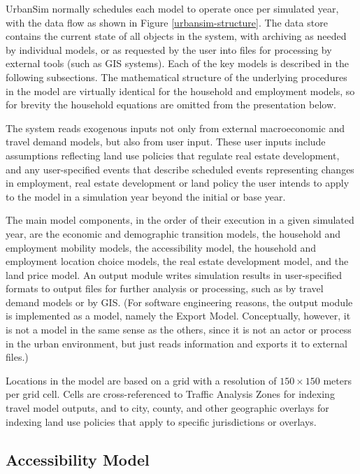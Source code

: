 \documentclass[fleqn]{article}
\begin{document}
UrbanSim normally schedules each model to operate once per simulated year,
with the data flow as shown in Figure \ref{urbansim-structure}.  The data
store contains
the current state of all objects in the system, with archiving as
needed by individual models, or as requested by the
user into files for processing by external tools (such
as GIS systems).  Each of the key
models is described in the following subsections.  The
mathematical structure of the underlying procedures in the model
are virtually identical for the household and employment
models, so for brevity the household equations are
omitted from the presentation below.

The system reads exogenous inputs not only from external
macroeconomic and travel demand models, but also from user input.
These user inputs include assumptions reflecting land use policies
that regulate real estate development, and any user-specified
events that describe scheduled events representing changes in
employment, real estate development or land policy the user
intends to apply to the model in a simulation year beyond the
initial or base year.

The main model components, in the order of their execution
in a given simulated year, are
the economic and demographic transition models, the household and
employment mobility models, the accessibility model, the household
and employment location choice models, the real estate development
model, and the land price model.  An output module writes
simulation results in user-specified formats to output files for
further analysis or processing, such as by travel demand models or
by GIS\@.  (For software engineering reasons, the output module is
implemented as a model, namely the Export Model.  Conceptually, however, it
is not a model in the same sense as the others, since it is not an actor or
process in the urban environment, but just reads information and exports it
to external files.)

Locations in the model are based on a grid with a resolution of
$150 \times 150$ meters per grid cell.  Cells are cross-referenced to
Traffic Analysis Zones for indexing travel model outputs, and to
city, county, and other geographic overlays for indexing land use
policies that apply to specific jurisdictions or overlays.

\subsection{Accessibility Model}
\label{accessibility-model}
\end{document}
